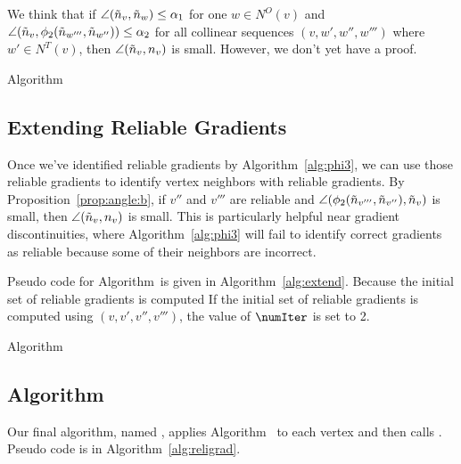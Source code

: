 We think that if $\angle(\tilde{n}_v,\tilde{n}_w) \le \alpha_1$ for one $w \in N^O(v)$
and $\angle(\tilde{n}_v,\phi_2(\tilde{n}_{w'''},\tilde{n}_{w''})) \le \alpha_2$
for all collinear sequences $(v,w',w'',w''')$ where $w' \in N^T(v)$,
then $\angle(\tilde{n}_v, n_v)$ is small.
However, we don't yet have a proof.


\begin{algorithm}[h]
\caption{Algorithm \protect\ExtendReliable}
\label{alg:extend}
\end{algorithm}

\subsection{Extending Reliable Gradients}
\label{sec:extendGrad}
Once we've identified reliable gradients by Algorithm~\ref{alg:phi3},
we can use those reliable gradients to identify vertex neighbors
with reliable gradients.
By Proposition~\ref{prop:angle:b},
if $v''$ and $v'''$ are reliable and 
$\angle(\phi_2(\tilde{n}_{v'''},\tilde{n}_{v''}), \tilde{n}_v)$ is small,
then $\angle(\tilde{n}_v, n_v)$ is small.
This is particularly helpful near gradient discontinuities,
where Algorithm~\ref{alg:phi3} will fail to identify correct gradients
as reliable because some of their neighbors are incorrect.

Pseudo code for Algorithm~\ExtendReliable is given 
in Algorithm~\ref{alg:extend}.
Because the initial set of reliable gradients is computed
If the initial set of reliable gradients is computed using $(v,v',v'',v''')$,
the value of $\numIter$ is set to 2.

\begin{algorithm}[h]
\BlankLine
\caption{Algorithm \protect\ReliGrad}
\label{alg:religrad}
\end{algorithm}

\subsection{Algorithm \protect\ReliGrad}
\label{sec:ReliGrad}

Our final algorithm, named \ReliGrad, applies Algorithm~\FindReliable
to each vertex and then calls \ExtendReliable.
Pseudo code is in Algorithm~\ref{alg:religrad}.

